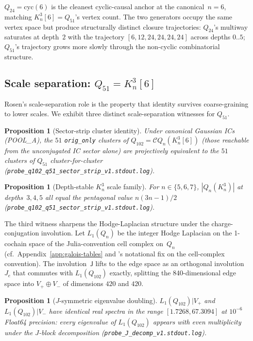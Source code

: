 \documentclass[12pt,a4paper]{article}
\newtheorem{proposition}[theorem]{Proposition}
\theoremstyle{definition}
\theoremstyle{remark}
\newcommand{\Kn}{K_n^3}
\newcommand{\Qn}{Q_n}
\newcommand{\Ccls}{\mathcal{C}}             %
\newcommand{\Jconj}{\mathsf{J}}             %
\newcommand{\cyc}{\mathrm{cyc}}
\begin{document}
$Q_{24} = \cyc(6)$ is the cleanest cyclic-causal anchor at the
canonical~$n=6$, matching $\Kn[6] = Q_{51}$'s vertex count. The two
generators occupy the same vertex space but produce structurally
distinct closure trajectories: $Q_{24}$'s multiway saturates at
depth~$2$ with the trajectory $[6, 12, 24, 24, 24, 24]$ across depths
$0..5$; $Q_{51}$'s trajectory grows more slowly through the
non-cyclic combinatorial structure.

\subsection{Scale separation: $Q_{51} = \Kn[6]$}\label{sec:fr-scale}

Rosen's scale-separation role is the property that identity survives
coarse-graining to lower scales. We exhibit three distinct
scale-separation witnesses for $Q_{51}$.

\begin{proposition}[Sector-strip cluster identity]\label{prop:sector-strip}
Under canonical Gaussian ICs (POOL\_A), the $51$ \texttt{orig\_only}
clusters of $Q_{102} = \Ccls\Qn(\Kn[6])$ (those reachable from the
unconjugated IC sector alone) are projectively equivalent to the $51$
clusters of $Q_{51}$ cluster-for-cluster
(\texttt{probe\_q102\_q51\_sector\_strip\_v1.stdout.log}).
\end{proposition}

\begin{proposition}[Depth-stable $\Kn$ scale family]\label{prop:scale-depth}
For $n \in \{5, 6, 7\}$, $|\Qn(\Kn)|$ at depths~$3, 4, 5$ all equal
the pentagonal value $n(3n{-}1)/2$
(\texttt{probe\_q102\_q51\_sector\_strip\_v1.stdout.log}).
\end{proposition}

The third witness sharpens the Hodge-Laplacian structure under the
charge-conjugation involution. Let $L_1(\Qn)$ be the integer Hodge
Laplacian on the 1-cochain space of the Julia-convention cell complex
on~$\Qn$ (cf.\ Appendix~\ref{app:galois-tables} and
\cite{closure-v5-audit-threebug}'s notational fix on the cell-complex
convention). The involution~$\Jconj$ lifts to the edge space as an
orthogonal involution~$J_e$ that commutes with $L_1(Q_{102})$ exactly,
splitting the 840-dimensional edge space into $V_+ \oplus V_-$ of
dimensions $420$ and $420$.

\begin{proposition}[$J$-symmetric eigenvalue doubling]\label{prop:J-symmetric}
$L_1(Q_{102}) | V_+$ and $L_1(Q_{102}) | V_-$ have identical real
spectra in the range $[1.7268, 67.3094]$ at $10^{-6}$ Float64
precision: every eigenvalue of $L_1(Q_{102})$ appears with
\emph{even} multiplicity under the $J$-block decomposition
(\texttt{probe\_J\_decomp\_v1.stdout.log}).
\end{proposition}
\end{document}

